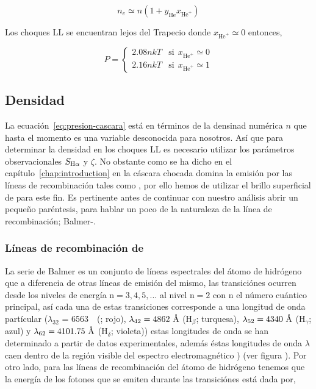 \begin{equation*}
  \label{eq:density}
  n_{e} \simeq n(1 +  y_{\text{He}}x_{\text{He}^{+}})
\end{equation*}

 Los choques LL se encuentran lejos del Trapecio donde \(x_{\text{He}^{+}} \simeq 0\) entonces,

\begin{equation}
  \label{eq:pressure}
  P =  \left\{ \begin{array}{ll}
  2.08 n k T  & \mathrm{si} ~~ \mbox{$x_{\text{He}^{+}} \simeq 0$}\\
  2.16 n k T  & \mathrm{si} ~~ \mbox{$x_{\text{He}^{+}} \simeq 1$}
 \end{array}
 \right.
\end{equation}

\subsection{Densidad }
\label{sec:densinty}

La ecuación~\ref{eq:presion-cascara} está en términos de la densinad numérica \(n\) que hasta el momento es una variable desconocida para nosotros. Así que para determinar la densidad en los choques LL es necesario utilizar los parámetros observacionales \(S_{\mathrm{H}\alpha{}}\) y \(\zeta\). No obstante como se ha dicho en el capítulo~\ref{chap:introduction} en la cáscara chocada domina la emisión por las líneas de recombinación tales como \ha{}, por ello hemos de utilizar el brillo superficial de \ha{} para este fin. Es pertinente antes de continuar con nuestro análisis abrir un pequeño paréntesis, para hablar un poco de la naturaleza de la línea de recombinación; Balmer-\ha{}.\\

\subsubsection{Líneas de recombinación de \ha{}}
\label{sec:lines-ha}

La serie de Balmer es un conjunto de líneas espectrales del átomo de hidrógeno que a diferencia de otras líneas de emisión del mismo, las transiciónes ocurren desde los niveles de energía \(\text{n}= 3,4,5,...\) al nivel \(\text{n}=2\) con \(\text{n}\) el número cuántico principal, así cada una de estas transiciones corresponde a una longitud de onda partícular (\(\lambda_{32}\) = 6563~\A~(\ha{}; rojo), \(\lambda_{42} = 4862~\text{\AA{}}{}\) (\(\text{H}_{\beta}\); turquesa), \(\lambda_{52} = 4340~\text{\AA{}}{}\) (\(\text{H}_{\gamma}\); azul) y \(\lambda_{62} = 4101.75~\text{\AA{}}{}\) (\(\text{H}_{\delta}\); violeta)) estas longitudes de onda se han determinado a partir de datos experimentales, además éstas longitudes de onda \(\lambda\) caen dentro de la región visible del espectro electromagnético \citep{Carroll:1996}) (ver figura ). Por otro lado, para las líneas de recombinación del átomo de hidrógeno tenemos que la energía de los fotones que se emiten durante las transiciónes está dada por,

